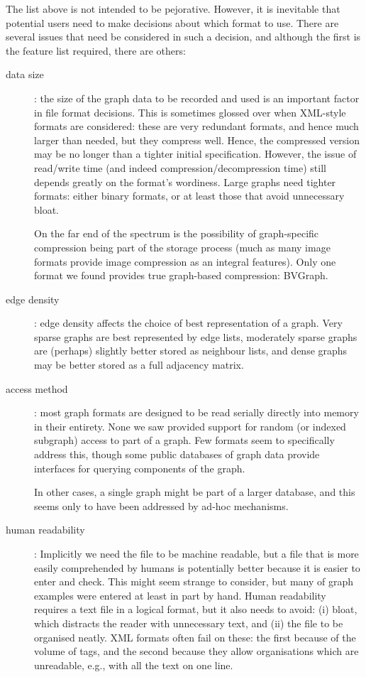 \documentclass{sig-alternate}
\begin{document}
The list above is not intended to be pejorative. However, it is
inevitable that potential users need to make decisions about which
format to use. There are several issues that need be considered in
such a decision, and although the first is the feature list required,
there are others:
\begin{description}

\item[data size]: the size of the graph data to be recorded and used
  is an important factor in file format decisions. This is sometimes
  glossed over when XML-style formats are considered: these are very
  redundant formats, and hence much larger than needed, but they
  compress well. Hence, the compressed version may be no longer than a
  tighter initial specification. However, the issue of read/write time
  (and indeed compression/decompression time) still depends greatly on
  the format's wordiness. Large graphs need tighter formats: either
  binary formats, or at least those that avoid unnecessary bloat. 

  On the far end of the spectrum is the possibility of graph-specific
  compression being part of the storage process (much as many image
  formats provide image compression as an integral features). Only one
  format we found provides true graph-based compression: BVGraph. 

\item[edge density]: edge density affects the choice of best
  representation of a graph. Very sparse graphs are best represented
  by edge lists, moderately sparse graphs are (perhaps) slightly
  better stored as neighbour lists, and dense graphs may be better
  stored as a full adjacency matrix. 

\item[access method]: most graph formats are designed to be read
  serially directly into memory in their entirety. None we saw
  provided support for random (or indexed subgraph) access to part of
  a graph. Few formats seem to specifically address this, though some
  public databases of graph data provide interfaces for querying
  components of the graph.

  In other cases, a single graph might be part of a larger database,
  and this seems only to have been addressed by ad-hoc mechanisms. 

\item[human readability]: Implicitly we need the file to be machine
  readable, but a file that is more easily comprehended by humans is
  potentially better because it is easier to enter and check. This
  might seem strange to consider, but many of graph examples were
  entered at least in part by hand. Human readability requires a text
  file in a logical format, but it also needs to avoid: (i) bloat,
  which distracts the reader with unnecessary text, and (ii) the file
  to be organised neatly. XML formats often fail on these: the first
  because of the volume of tags, and the second because they allow
  organisations which are unreadable, e.g., with all the text on one
  line.


\end{description}
\end{document}

